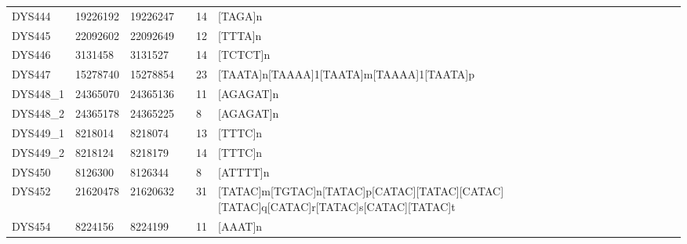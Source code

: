 \begin{tabularx}{\linewidth}{l l l l l l }
DYS444      & 19226192 & 19226247 &                        & 14 & {[}TAGA{]}n                                                                                                                          \\
DYS445      & 22092602 & 22092649 &                        & 12 & {[}TTTA{]}n                                                                                                                          \\
DYS446      & 3131458  & 3131527  &                        & 14 & {[}TCTCT{]}n                                                                                                                         \\
DYS447      & 15278740 & 15278854 &                        & 23 & {[}TAATA{]}n{[}TAAAA{]}1{[}TAATA{]}m{[}TAAAA{]}1{[}TAATA{]}p                                                                         \\
DYS448\_1   & 24365070 & 24365136 &                        & 11 & {[}AGAGAT{]}n                                                                                                                        \\
DYS448\_2   & 24365178 & 24365225 &                        & 8  & {[}AGAGAT{]}n                                                                                                                        \\
DYS449\_1   & 8218014  & 8218074  &                        & 13 & {[}TTTC{]}n                                                                                                                          \\
DYS449\_2   & 8218124  & 8218179  &                        & 14 & {[}TTTC{]}n                                                                                                                          \\
DYS450      & 8126300  & 8126344  &                        & 8  & {[}ATTTT{]}n                                                                                                                         \\
DYS452      & 21620478 & 21620632 &                        & 31 & {[}TATAC{]}m{[}TGTAC{]}n{[}TATAC{]}p{[}CATAC{]}{[}TATAC{]}{[}CATAC{]}{[}TATAC{]}q{[}CATAC{]}r{[}TATAC{]}s{[}CATAC{]}{[}TATAC{]}t     \\
DYS454      & 8224156  & 8224199  &                        & 11 & {[}AAAT{]}n                                                                                                                          \\

\end{tabularx}

